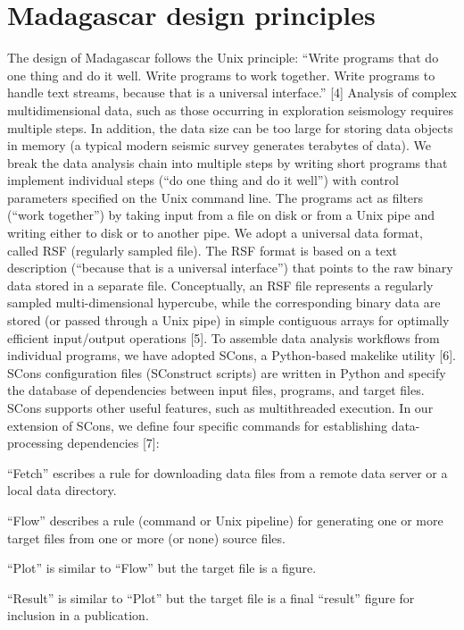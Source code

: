 \section{Madagascar design principles}

The design of Madagascar follows the Unix principle: ``Write
programs that do one thing and do it well. Write programs to work
together. Write programs to handle text streams, because that is a
universal interface.'' [4] Analysis of complex multidimensional
data, such as those occurring in exploration seismology requires
multiple steps. In addition, the data size can be too large for
storing data objects in memory (a typical modern seismic survey
generates terabytes of data). We break the data analysis chain into
multiple steps by writing short programs that implement individual
steps (``do one thing and do it well'') with control
parameters specified on the Unix command line. The programs act as
filters (``work together'') by taking input from a file
on disk or from a Unix pipe and writing either to disk or to another
pipe. We adopt a universal data format, called RSF (regularly sampled
file). The RSF format is based on a text description (``because
that is a universal interface'') that points to the raw binary
data stored in a separate file. Conceptually, an RSF file represents a
regularly sampled multi-dimensional hypercube, while the corresponding
binary data are stored (or passed through a Unix pipe) in simple
contiguous arrays for optimally efficient input/output operations [5].
To assemble data analysis workflows from individual programs, we have
adopted SCons, a Python-based makelike utility [6]. SCons
configuration files (SConstruct scripts) are written in Python and
specify the database of dependencies between input files, programs,
and target files. SCons supports other useful features, such as
multithreaded execution. In our extension of SCons, we define four
specific commands for establishing data-processing dependencies [7]:

``Fetch'' escribes a rule for downloading data
files from a remote data server or a local data directory.

``Flow'' describes a rule (command or Unix pipeline) for
generating one or more target files from one or more (or none) source
files.

``Plot'' is similar to ``Flow'' but the target file is a figure.

``Result'' is similar to ``Plot'' but the
target file is a final ``result'' figure for inclusion
in a publication.

